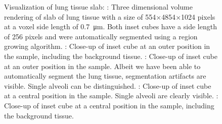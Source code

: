 \begin{figure}
{%
	 	\label{subfig:LungSlabDetailsRedBG}%
		}
	\caption{Visualization of lung tissue slab: %
		: Three dimensional volume rendering of slab of lung tissue with a size of 554$\times$4854$\times$1024 pixels at a voxel side length of \SI{0.7}{\micro\meter}. Both inset cubes have a side length of 256 pixels and were automatically segmented using a region growing algorithm. 
 		: Close-up of inset cube at an outer position in the sample, including the background tissue. %
 		: Close-up of inset cube at an outer position in the sample. Albeit we have been able to automatically segment the lung tissue, segmentation artifacts are visible. Single alveoli can be distinguished. %
 		: Close-up of inset cube at a central position in the sample. Single alveoli are clearly visible. %
 		: Close-up of inset cube at a central position in the sample, including the background tissue. %
	}
	\label{fig:LungSlabSophie}%
\end{figure}